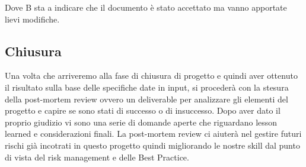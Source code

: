Dove B sta a indicare che il documento è stato accettato ma vanno apportate lievi modifiche.

\subsection{Chiusura}
Una volta che arriveremo alla fase di chiusura di progetto e quindi aver ottenuto il risultato sulla base delle specifiche date in input, si procederà con la stesura della post-mortem review ovvero un deliverable per analizzare gli elementi del progetto e capire se sono stati di successo o di insuccesso. Dopo aver dato il proprio giudizio vi sono una serie di domande aperte che riguardano lesson learned e considerazioni finali.
La post-mortem review ci aiuterà nel gestire futuri rischi già incotrati in questo progetto quindi migliorando le nostre skill dal punto di vista del risk management e delle Best Practice.
